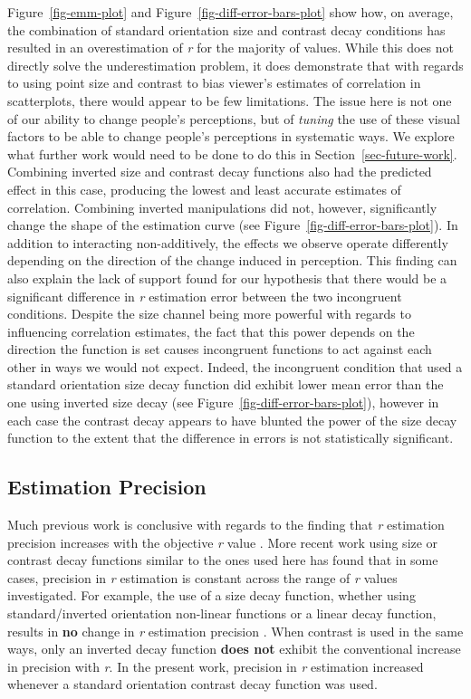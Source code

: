 \documentclass[manuscript, anonymous, screen]{acmart}
\begin{document}
Figure~\ref{fig-emm-plot} and Figure~\ref{fig-diff-error-bars-plot} show
how, on average, the combination of standard orientation size and
contrast decay conditions has resulted in an overestimation of \emph{r}
for the majority of values. While this does not directly solve the
underestimation problem, it does demonstrate that with regards to using
point size and contrast to bias viewer's estimates of correlation in
scatterplots, there would appear to be few limitations. The issue here
is not one of our ability to change people's perceptions, but of
\emph{tuning} the use of these visual factors to be able to change
people's perceptions in systematic ways. We explore what further work
would need to be done to do this in Section~\ref{sec-future-work}.
Combining inverted size and contrast decay functions also had the
predicted effect in this case, producing the lowest and least accurate
estimates of correlation. Combining inverted manipulations did not,
however, significantly change the shape of the estimation curve (see
Figure~\ref{fig-diff-error-bars-plot}). In addition to interacting
non-additively, the effects we observe operate differently depending on
the direction of the change induced in perception. This finding can also
explain the lack of support found for our hypothesis that there would be
a significant difference in \emph{r} estimation error between the two
incongruent conditions. Despite the size channel being more powerful
with regards to influencing correlation estimates, the fact that this
power depends on the direction the function is set causes incongruent
functions to act against each other in ways we would not expect. Indeed,
the incongruent condition that used a standard orientation size decay
function did exhibit lower mean error than the one using inverted size
decay (see Figure~\ref{fig-diff-error-bars-plot}), however in each case
the contrast decay appears to have blunted the power of the size decay
function to the extent that the difference in errors is not
statistically significant.

\hypertarget{estimation-precision}{%
\subsection{Estimation Precision}\label{estimation-precision}}

Much previous work is conclusive with regards to the finding that
\emph{r} estimation precision increases with the objective \emph{r}
value
\citep{rensink_2010, rensink_2012, rensink_2014, rensink_2017, doherty_2007}.
More recent work using size or contrast decay functions similar to the
ones used here \citep{strain_2023, strain_2023b} has found that in some
cases, precision in \emph{r} estimation is constant across the range of
\emph{r} values investigated. For example, the use of a size decay
function, whether using standard/inverted orientation non-linear
functions or a linear decay function, results in \textbf{no} change in
\emph{r} estimation precision \citep{strain_2023b}. When contrast is
used in the same ways, only an inverted decay function \textbf{does not}
exhibit the conventional increase in precision with \emph{r}. In the
present work, precision in \emph{r} estimation increased whenever a
standard orientation contrast decay function was used.
\end{document}

